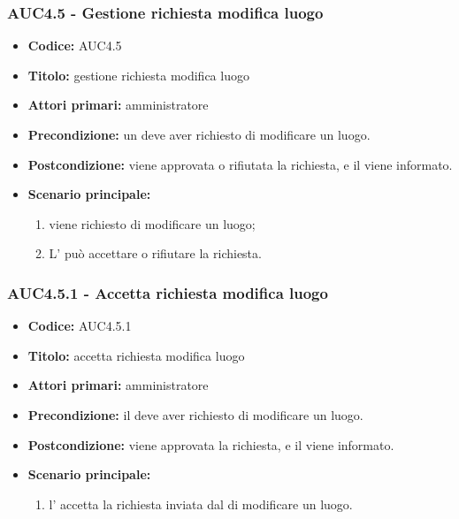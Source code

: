 \documentclass[casi-duso]{subfiles}
\begin{document}
\subsubsection{AUC4.5 - Gestione richiesta modifica luogo}%
\label{subsub:AUC4.5}
\begin{itemize}
  \item \textbf{Codice:} AUC4.5
  \item \textbf{Titolo:} gestione richiesta modifica luogo
  \item \textbf{Attori primari:} amministratore
  \item \textbf{Precondizione:} un  deve aver richiesto di modificare un luogo.
  \item \textbf{Postcondizione:} viene approvata o rifiutata la richiesta, e il  viene informato.
  \item \textbf{Scenario principale:}
  \begin{enumerate}
    \item viene richiesto di modificare un luogo;
    \item L' può accettare o rifiutare la richiesta.
  \end{enumerate}
\end{itemize}

\subsubsection{AUC4.5.1 - Accetta richiesta modifica luogo}%
\label{subsub:AUC4.5.1}
\begin{itemize}
  \item \textbf{Codice:} AUC4.5.1
  \item \textbf{Titolo:} accetta richiesta modifica luogo
  \item \textbf{Attori primari:} amministratore
  \item \textbf{Precondizione:} il  deve aver richiesto di modificare un luogo.
  \item \textbf{Postcondizione:} viene approvata la richiesta, e il  viene informato.
  \item \textbf{Scenario principale:}
  \begin{enumerate}
    \item  l' accetta la richiesta inviata dal  di modificare un luogo.
  \end{enumerate}
\end{itemize}
\end{document}
